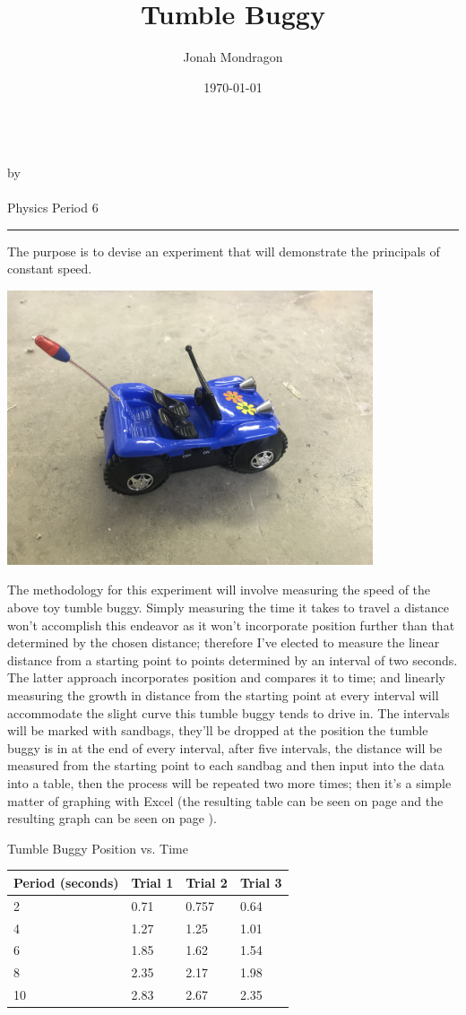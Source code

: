\documentclass[12pt]{article}
\newcommand{\PutTitle}[1]
{ \begin{center}
        {\huge\bfseries\thetitle}\\
        by \theauthor\\
        \thedate\\
        #1        
    \end{center}
    \hrule
    \vspace{2ex}
}
\begin{document}
\title{Tumble Buggy}
\author{Jonah Mondragon}
\date{\today}
\PutTitle{Physics Period 6}

\doublespacing

The purpose is to devise an experiment that will demonstrate the principals of
constant speed.

\begin{center}
\includegraphics[width=4.25in]{tumble_buggy.jpg}
\end{center}

The methodology for this experiment will involve measuring the speed of the
above toy tumble buggy. Simply measuring the time it takes to travel a distance
won't accomplish this endeavor as it won't incorporate position further than
that determined by the chosen distance; therefore I've elected to measure the
linear distance from a starting point to points determined by an interval of
two seconds. The latter approach incorporates position and compares it to time;
and linearly measuring the growth in distance from the starting point at every
interval will accommodate the slight curve this tumble buggy tends to drive in.
The intervals will be marked with sandbags, they'll be dropped at the position
the tumble buggy is in at the end of every interval, after five intervals, the
distance will be measured from the starting point to each sandbag and then
input into the data into a table, then the process will be repeated two more
times; then it's a simple matter of graphing with Excel (the resulting table
can be seen on page \pageref{table} and the resulting graph can be seen on page
\pageref{graph}).

\newpage

\begin{table}
    \centering
    Tumble Buggy Position vs. Time\\
    \begin{tabular}{|l|l|l|l|}
    \hline
        Period (seconds) & Trial 1 & Trial 2 & Trial 3 \\ \hline
        2 & 0.71 & 0.757 & 0.64 \\ \hline
        4 & 1.27 & 1.25 & 1.01 \\ \hline
        6 & 1.85 & 1.62 & 1.54 \\ \hline
        8 & 2.35 & 2.17 & 1.98 \\ \hline
        10 & 2.83 & 2.67 & 2.35 \\ \hline
    \end{tabular}
\end{table}
\label{table}
\end{document}
